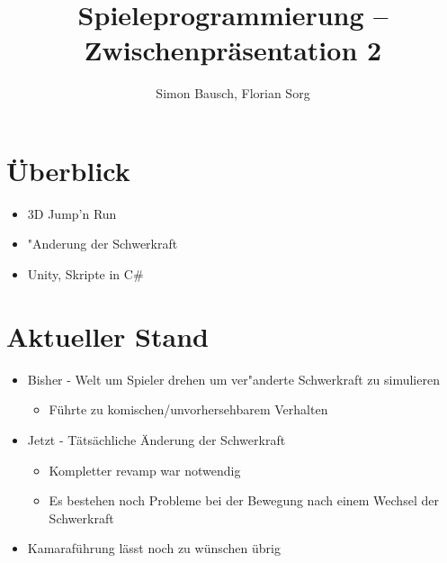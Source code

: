 \documentclass[landscape,compress,table]{beamer}
\title{Spieleprogrammierung -- Zwischenpräsentation 2}
\author{Simon Bausch, Florian Sorg}
\institute{Hochschule Aalen}
\begin{document}
\begin{frame}
	\titlepage
\end{frame}

\begin{frame}
	\tableofcontents
\end{frame}

\section{Überblick}
\begin{frame}
	\begin{itemize}
		\item 3D Jump'n Run
		\item "Anderung der Schwerkraft
		\item Unity, Skripte in C\#
	\end{itemize}
\end{frame}

\section{Aktueller Stand}
\begin{frame}
	\begin{itemize}
		\item Bisher - Welt um Spieler drehen um ver"anderte Schwerkraft zu simulieren
			\begin{itemize}
				\item Führte zu komischen/unvorhersehbarem Verhalten 
			\end{itemize}
			\item Jetzt - Tätsächliche Änderung der Schwerkraft
			\begin{itemize}
				\item Kompletter revamp war notwendig
				\item Es bestehen noch Probleme bei der Bewegung nach einem Wechsel der Schwerkraft
			\end{itemize}
			\item Kamaraführung lässt noch zu wünschen übrig
	\end{itemize}
\end{frame}
\end{document}
